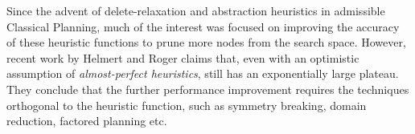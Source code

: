 
Since the advent of delete-relaxation and abstraction heuristics in
admissible Classical Planning, much of the interest was focused on improving
the accuracy of these heuristic functions to prune more nodes from the
search space.
% 
However, recent work by Helmert and Roger
 claims that, even with an optimistic
assumption of \emph{almost-perfect heuristics}, \astar still has an
exponentially large plateau. They conclude that the further performance
improvement requires the techniques orthogonal to the heuristic
function, such as symmetry breaking, domain reduction, factored planning
etc.
